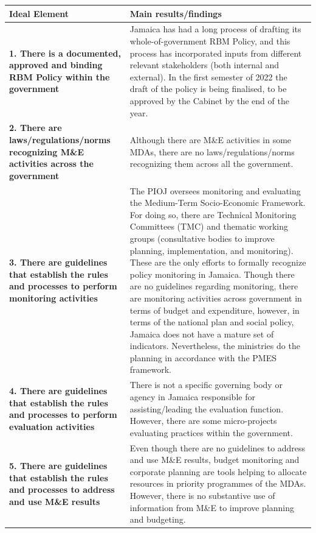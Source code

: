 \documentclass[
  10pt,
]{book}
\begin{document}
\begingroup\fontsize{12}{14}\selectfont

\begin{tabu} to 
\hline
Ideal Element & Main results/findings\\
\hline
\textbf{1. There is a documented, approved and binding RBM Policy within the government} & Jamaica has had a long process of drafting its whole-of-government RBM Policy, and this process has incorporated inputs from different relevant stakeholders (both internal and external). In the first semester of 2022 the draft of the policy is being finalised, to be approved by the Cabinet by the end of the year.\\
\hline
\textbf{2. There are laws/regulations/norms recognizing M\&E activities across the government} & Although there are M\&E activities in some MDAs, there are no laws/regulations/norms recognizing them across all the government.\\
\hline
\textbf{3. There are guidelines that establish the rules and processes to perform monitoring activities} & The PIOJ oversees monitoring and evaluating the Medium-Term Socio-Economic Framework. For doing so, there are Technical Monitoring Committees (TMC) and thematic working groups (consultative bodies to improve planning, implementation, and monitoring). These are the only efforts to formally recognize policy monitoring in Jamaica. Though there are no guidelines regarding monitoring, there are monitoring activities across government in terms of budget and expenditure, however, in terms of the national plan and social policy, Jamaica does not have a mature set of indicators. Nevertheless, the ministries do the planning in accordance with the PMES framework.\\
\hline
\textbf{4. There are guidelines that establish the rules and processes to perform evaluation activities} & There is not a specific governing body or agency in Jamaica responsible for assisting/leading the evaluation function. However, there are some micro-projects evaluating practices within the government.\\
\hline
\textbf{5. There are guidelines that establish the rules and processes to address and use M\&E results} & Even though there are no guidelines to address and use M\&E results, budget monitoring and corporate planning are tools helping to allocate resources in priority programmes of the MDAs. However, there is no substantive use of information from M\&E to improve planning and budgeting.\\

\end{tabu}
\end{document}
